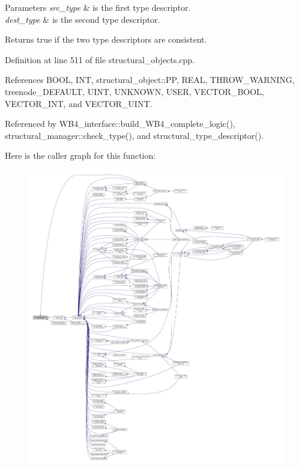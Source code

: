 \begin{DoxyParams}{Parameters}
{\em src\+\_\+type} & is the first type descriptor. \\
\hline
{\em dest\+\_\+type} & is the second type descriptor. \\
\hline
\end{DoxyParams}
\begin{DoxyReturn}{Returns}
true if the two type descriptors are consistent. 
\end{DoxyReturn}


Definition at line 511 of file structural\+\_\+objects.\+cpp.



References B\+O\+OL, I\+NT, structural\+\_\+object\+::\+PP, R\+E\+AL, T\+H\+R\+O\+W\+\_\+\+W\+A\+R\+N\+I\+NG, treenode\+\_\+\+D\+E\+F\+A\+U\+LT, U\+I\+NT, U\+N\+K\+N\+O\+WN, U\+S\+ER, V\+E\+C\+T\+O\+R\+\_\+\+B\+O\+OL, V\+E\+C\+T\+O\+R\+\_\+\+I\+NT, and V\+E\+C\+T\+O\+R\+\_\+\+U\+I\+NT.



Referenced by W\+B4\+\_\+interface\+::build\+\_\+\+W\+B4\+\_\+complete\+\_\+logic(), structural\+\_\+manager\+::check\+\_\+type(), and structural\+\_\+type\+\_\+descriptor().

Here is the caller graph for this function\+:
\nopagebreak
\begin{figure}[H]
\begin{center}
\leavevmode
\includegraphics[width=350pt]{dc/da4/structstructural__type__descriptor_a526678aa02ed449cfc5a2a6268de0963_icgraph}
\end{center}
\end{figure}
\mbox{\label{structstructural__type__descriptor_af7c96c3d31b4d1c294d170cbf08c4c68}} 
